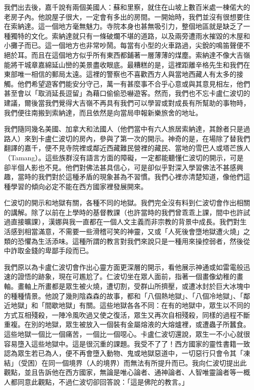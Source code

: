 我們出去後，嘉千說有兩個美國人：蘇和里察，就住在山坡上數百米處一棟偌大的老房子內。他說屋子很大，一定會有多出的房間。一開始時，我們並沒有很想要住在索納達。這一個地方毫無魅力。寺院本身也甚無吸引力，整個地區就是缺乏了一種獨特的文化。索納達就只有一條破爛不堪的道路，以及兩旁遭雨水摧毀的木屋和小攤子而已。這一個地方也非常吵鬧。每當有小型的火車路過，尖銳的鳴笛聲便不絕於耳。而且在這個地方似乎所有東西都鋪著一層薄薄的煤塵。索納達不像大吉嶺能將干城章嘉綿延山巒的美景盡收眼底。最糟糕的是，這裡距離辛格先生和我們在東部唯一相信的郵局太遠。這裡的警察也不喜歡西方人與當地西藏人有太多的接觸。他們希望遊客們能安分守己，萬一有甚麼事不合乎心意或與其意見相左，他們甚至會以「取消延長逗留」為藉口偷偷恐嚇遊客。然而，我們也不忘卡盧仁波切的建議，爾後當我們覺得大吉嶺不再具有我們可以學習或對成長有所幫助的事物時，我們便往南搬到索納達，而且依然是向當局申報新樂旅舍的地址。

我們隨同幾名美國、加拿大和法國人（他們當中有六人旅居索納達，其餘者只是過路人）來到卡盧仁波切的房內，參與了第一次的開示。神奇的是，在場除了替我們翻譯的嘉千，便不見寺院裡或鄰近西藏難民營裡的藏民、當地的雪巴人或塔芒族人（Tamang）。這些族群沒有語言方面的障礙，一定都能聽懂仁波切的開示，可是卻半個人影也不見。他們對佛法甚具信心，可是卻似乎對深入學習佛法不甚感興趣，當時的我們對於這種矛盾的現象甚為不習慣。我們心裡亦清楚知道，像他們這種學習的傾向必定不能在西方國家裡發展開來。

仁波切的開示和地獄有關，各種不同的地獄。我們完全沒有料到仁波切會作出相關的講解。除了以前在上學時的基督教課（也許當時的我們曾乖乖上課，間中也許試過直接曠課），漢娜與我一直都在一個人文主義而非宗教的背景中成長。我們對生活感到相當滿意，不需要一些滑稽可笑的神靈，又或「人死後會墮地獄遭火燒」之類的恐懼為生活添味。這種所謂的教言對我們來說只是一種用來操控弱者，然後從中詐取金錢的卑鄙手段而已。

我們原以為卡盧仁波切會作出心靈方面更深層的開示，看他展示神通或如雷電般迅速的證悟的跡象，現在可尷尬了。仁波切坐在眾人面前，指著一個畫像幼稚的畫軸。畫軸上所畫都是眾生被火燒，遭切割，受群山所擠壓，或遭冰封於巨大冰塊中的種種情景。他說了幾則陰森森的故事，都和「八個熱地獄」、「八個冷地獄」、「鄰近地獄」和「間歇地獄」有關。這些地獄各各不同：在有的地獄中，眾生以不同的方式互相殘殺，一陣冷風吹過又使之復活，眾生又再次自相殘殺，同樣的過程不斷重複。在別的地獄，眾生被放入一個裝有金屬熔液的大熔爐裡，或遭蟲子所蠶食。這些地獄一個比一個痛苦，一個比一個噁心。卡盧仁波切還說，眾生一不小心就很容易墮入這些地獄中。這是很沉重的課題。我受不了了！西方國家的靈性書籍一致認為眾生若已為人，便不再會墮入動物、鬼或地獄惡道中，一切惡行只會令其「凍結」（受困）在同一個境界（人的境界）而無法有所提升而已。我向仁波切提出此觀點，並且告訴他在西方國家，無論是唯心論者、通神論者、人智唯靈論者等一概人都同意此觀點，不過仁波切卻回答說：「這是佛陀的教言。」

